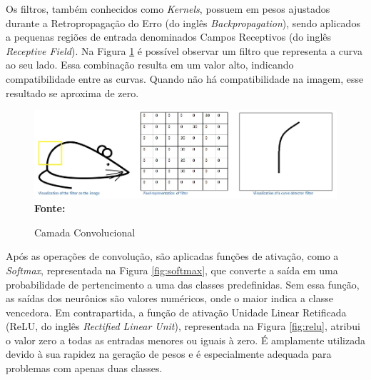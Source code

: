 Os filtros, também conhecidos como \textit{Kernels}, possuem em pesos ajustados durante a Retropropagação do Erro (do inglês \textit{Backpropagation}), sendo aplicados a pequenas regiões de entrada denominados Campos Receptivos (do inglês \textit{Receptive Field}). Na Figura \ref{fig:conv2} é possível observar um filtro que representa a curva ao seu lado. Essa combinação resulta em um valor alto, indicando compatibilidade entre as curvas. Quando não há compatibilidade na imagem, esse resultado se aproxima de zero.

\begin{figure}[ht]
 	\centering	
 	\caption[\hspace{0.1cm}Grade Computacional.]{Camada Convolucional}
 	\vspace{-0.4cm}
 	\includegraphics[width=1\textwidth]{figuras/conv.png}
 	\captionsetup{justification=centering}
	\vspace{-0.2cm}
     \\\textbf{\footnotesize Fonte: \cite{cnns}}
	\label{fig:conv2}
\end{figure}


Após as operações de convolução, são aplicadas funções de ativação, como a \textit{Softmax}, representada na Figura \ref{fig:softmax}, que converte a saída em uma probabilidade de pertencimento a uma das classes predefinidas. Sem essa função, as saídas dos neurônios são valores numéricos, onde o maior indica a classe vencedora. Em contrapartida, a função de ativação Unidade Linear Retificada (ReLU, do inglês \textit{Rectified Linear Unit}), representada na Figura \ref{fig:relu}, atribui o valor zero a todas as entradas menores ou iguais à zero. É amplamente utilizada devido à sua rapidez na geração de pesos e é especialmente adequada para problemas com apenas duas classes.

